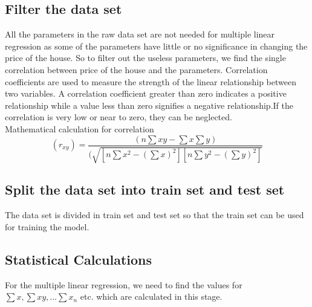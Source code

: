 \subsection{Filter the data set}
\vspace{-18pt}
All the parameters in the raw data set are not needed for multiple linear regression as some of the parameters have little or no significance in changing the price of the house. So to filter out the useless parameters, we find the single correlation between price of the house and the parameters. Correlation coefficients are used to measure the strength of the linear relationship between two variables. A correlation coefficient greater than zero indicates a positive relationship while a value less than zero signifies a negative relationship.If the correlation is very low or near to zero, they can be neglected.\\
Mathematical calculation for correlation
\begin{equation}
(r_{xy}) =\frac {(n\sum{xy}-\sum{x}\sum{y})}{(\sqrt{[n\sum{x^2}-(\sum{x})^2][n\sum{y^2}-(\sum{y})^2]}}
\end{equation}
\subsection{Split the data set into train set and test set}
\vspace{-18pt}
The data set is divided in train set and test set so that the train set can be used for training the model.
\subsection{Statistical Calculations}
\vspace{-18pt}
For the multiple linear regression, we need to find the values for $\sum{x},\sum{xy},...\sum{x_{n}}$ etc. which are calculated in this stage.
